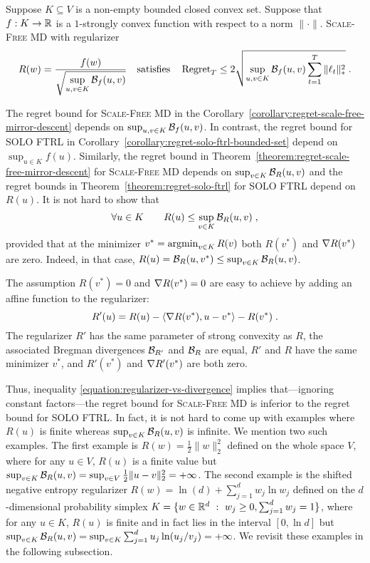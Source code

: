 \begin{corollary}
\label{corollary:regret-scale-free-mirror-descent}
Suppose $K \subseteq V$ is a non-empty bounded closed convex set.  Suppose
that $f:K \to \mathbb{R}$ is a $1$-strongly convex function with respect to a norm
$\|\cdot\|$.  \textsc{Scale-Free MD} with regularizer
$$
R(w) = \frac{f(w)}{\displaystyle \sqrt{\sup_{u,v \in K} \Breg_f(u,v)}}
\quad \text{satisfies} \quad %
\Regret_T \le 2 \sqrt{\sup_{u,v \in K} \Breg_f(u,v) \sum_{t=1}^T \|\ell_t\|_*^2} \; .
$$
\end{corollary}

The regret bound for \textsc{Scale-Free MD} in the
Corollary~\ref{corollary:regret-scale-free-mirror-descent} depends on
$\sup_{u,v \in K} \mathcal{B}_f(u,v)$. In contrast, the regret bound for
\textsc{SOLO FTRL} in Corollary~\ref{corollary:regret-solo-ftrl-bounded-set}
depend on $\sup_{u \in K} f(u)$.  Similarly, the regret bound in
Theorem~\ref{theorem:regret-scale-free-mirror-descent} for \textsc{Scale-Free
MD} depends on $\sup_{v \in K} \mathcal{B}_R(u,v)$ and the regret bounds in
Theorem~\ref{theorem:regret-solo-ftrl}
for \textsc{SOLO FTRL} depend on $R(u)$. It is not hard to
show that
\begin{equation}
\label{equation:regularizer-vs-divergence}
\forall u \in K \qquad R(u) \le \sup_{v \in K} \mathcal{B}_R(u,v) \; ,
\end{equation}
provided that at the minimizer $v^* = \operatorname*{argmin}_{v \in K} R(v)$ both $R(v^*)$ and
$\nabla R(v^*)$ are zero. Indeed, in that case, $R(u) = \mathcal{B}_R(u,v^*) \le
\sup_{v \in K} \mathcal{B}_R(u,v)$.

The assumption $R(v^*) = 0$ and $\nabla R(v^*) = 0$
are easy to achieve by adding an affine function to the regularizer:
$$
R'(u) = R(u) - \langle \nabla R(v^*), u - v^* \rangle - R(v^*) \; .
$$
The regularizer $R'$ has the same parameter of strong convexity as $R$, the
associated Bregman divergences $\mathcal{B}_{R'}$ and $\mathcal{B}_{R}$ are equal, $R'$ and
$R$ have the same minimizer $v^*$, and $R'(v^*)$ and $\nabla R'(v^*)$ are both
zero.

Thus, inequality \eqref{equation:regularizer-vs-divergence} implies
that---ignoring constant factors---the regret bound for \textsc{Scale-Free MD}
is inferior to the regret bound for \textsc{SOLO FTRL}.
In fact, it is not hard to come up with examples where $R(u)$ is finite whereas
$\sup_{v \in K} \mathcal{B}_R(u,v)$ is infinite. We mention two such examples. The
first example is $R(w) = \frac{1}{2}\|w\|_2^2$ defined on the whole space $V$,
where for any $u \in V$, $R(u)$ is a finite value but $\sup_{v \in K}
\mathcal{B}_R(u,v) = \sup_{v \in V} \frac{1}{2}\|u-v\|_2^2 = +\infty$. The second
example is the shifted negative entropy regularizer $R(w) = \ln(d) +
\sum_{j=1}^d w_j \ln w_j$ defined on the $d$-dimensional probability simplex $K
= \{ w \in \mathbb{R}^d ~:~ w_j \ge 0, \sum_{j=1}^d w_j = 1 \}$, where for any $u \in
K$, $R(u)$ is finite and in fact lies in the interval $[0, \ln d]$ but
$\sup_{v \in K} \mathcal{B}_R(u,v) = \sup_{v \in K} \sum_{j=1}^d u_j \ln(u_j/v_j) = +
\infty$. We revisit these examples in the following subsection.

